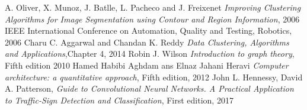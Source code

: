 \documentclass{usiinftr}
\begin{document}
\begin{thebibliography}{1}
		A. Oliver, X. Munoz, J. Batlle, L. Pacheco and J. Freixenet
		\textit{Improving Clustering Algorithms for Image Segmentation using Contour and Region Information},
		2006 IEEE International Conference on Automation, Quality and Testing, Robotics,
		2006
		Charu C. Aggarwal  and Chandan K. Reddy
		\textit{Data Clustering, Algorithms and Applications},Chapter 4,
		2014
		Robin J. Wilson
		\textit{Introduction to graph theory}, Fifth edition
		2010
		Hamed Habibi Aghdam ans Elnaz Jahani Heravi
		\textit{Computer architecture: a quantitative approach}, Fifth edition,
		2012
		John L. Hennessy, David A. Patterson,
		\textit{Guide to Convolutional Neural Networks. A Practical Application to Traffic-Sign Detection and Classification}, First edition,
		2017
\end{thebibliography}


\end{document}
